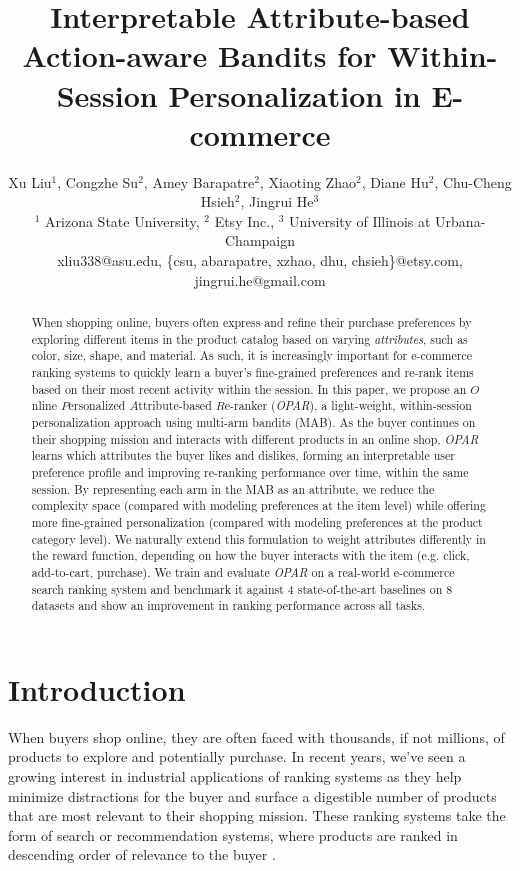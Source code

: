 \documentclass[11pt, dvipdfmx]{article}
\begin{document}
\title{Interpretable Attribute-based Action-aware Bandits for Within-Session Personalization in E-commerce}

\author{Xu Liu$^{1}$, Congzhe Su$^{2}$, Amey Barapatre$^{2}$, Xiaoting Zhao$^{2}$, Diane Hu$^{2}$, Chu-Cheng Hsieh$^{2}$, Jingrui He$^{3}$ \\
$^{1}$ Arizona State University, $^{2}$ Etsy Inc.,
$^{3}$ University of Illinois at Urbana-Champaign \\
xliu338@asu.edu, \{csu, abarapatre, xzhao, dhu, chsieh\}@etsy.com, jingrui.he@gmail.com
}
 
 
\maketitle
\begin{abstract}
When shopping online, buyers often express and refine their purchase preferences by exploring different items in the product catalog based on varying \emph{attributes}, such as color, size, shape, and material. As such, it is increasingly important for e-commerce ranking systems to quickly learn a buyer's fine-grained preferences and re-rank items based on their most recent activity within the session. In this paper, we propose an $O$nline $P$ersonalized $A$ttribute-based $R$e-ranker (\emph{OPAR}), a light-weight, within-session personalization approach using multi-arm bandits (MAB). As the buyer continues on their shopping mission and interacts with different products in an online shop, \emph{OPAR} learns which attributes the buyer likes and dislikes, forming an interpretable user preference profile and improving re-ranking performance over time, within the same session. By representing each arm in the MAB as an attribute, we reduce the complexity space (compared with modeling preferences at the item level) while offering more fine-grained personalization  (compared with modeling preferences at the product category level). We naturally extend this formulation to weight attributes differently in the reward function, depending on how the buyer interacts with the item (e.g. click, add-to-cart, purchase). We train and evaluate \emph{OPAR} on a real-world e-commerce search ranking system and benchmark it against 4 state-of-the-art baselines on 8 datasets and show an improvement in ranking performance across all tasks. 
\end{abstract}


\section{Introduction}\label{sec:intro}
When buyers shop online, they are often faced with thousands, if not millions, of products to explore and potentially purchase. In recent years, we've seen a growing interest in industrial applications of ranking systems as they help minimize distractions for the buyer and surface a digestible number of products that are most relevant to their shopping mission. These ranking systems take the form of search or recommendation systems, where products are ranked in descending order of relevance to the buyer 
\cite{KDD18_TaobaoSearch_RL,KDD18_JD_nextItemRecs,kdd19_amazon_product_search,wu2018turning,MLKD19_JD_onlineRanking,kdd20_sequentialRec}. 
\end{document}
